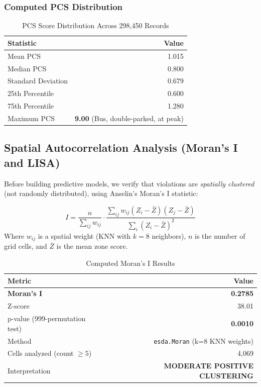 \documentclass[12pt,a4paper]{article}
\begin{document}
\subsubsection{Computed PCS Distribution}

\begin{table}[H]
\centering
\caption{PCS Score Distribution Across 298,450 Records}
\begin{tabular}{lr}
\toprule
\textbf{Statistic} & \textbf{Value} \\
\midrule
Mean PCS & 1.015 \\
Median PCS & 0.800 \\
Standard Deviation & 0.679 \\
25th Percentile & 0.600 \\
75th Percentile & 1.280 \\
\rowcolor{alertred!10} Maximum PCS & \textbf{9.00} (Bus, double-parked, at peak) \\
\bottomrule
\end{tabular}
\end{table}

\subsection{Spatial Autocorrelation Analysis (Moran's I and LISA)}

Before building predictive models, we verify that violations are \textit{spatially clustered} (not randomly distributed), using Anselin's Moran's I statistic:

\begin{tcolorbox}[formulabox]
\begin{equation}
    I = \frac{n}{\sum_{ij} w_{ij}} \cdot \frac{\sum_{ij} w_{ij}(Z_i - \bar{Z})(Z_j - \bar{Z})}{\sum_i (Z_i - \bar{Z})^2}
    \label{eq:morans_i}
\end{equation}
Where $w_{ij}$ is a spatial weight (KNN with $k=8$ neighbors), $n$ is the number of grid cells, and $\bar{Z}$ is the mean zone score.
\end{tcolorbox}

\begin{table}[H]
\centering
\caption{Computed Moran's I Results}
\begin{tabular}{lr}
\toprule
\textbf{Metric} & \textbf{Value} \\
\midrule
\rowcolor{emerald!10} \textbf{Moran's I} & \textbf{0.2785} \\
Z-score & 38.01 \\
p-value (999-permutation test) & \textbf{0.0010} \\
Method & \texttt{esda.Moran} (k=8 KNN weights) \\
Cells analyzed (count $\geq 5$) & 4,069 \\
\rowcolor{emerald!10} Interpretation & \textbf{MODERATE POSITIVE CLUSTERING} \\
\bottomrule
\end{tabular}
\end{table}
\end{document}
